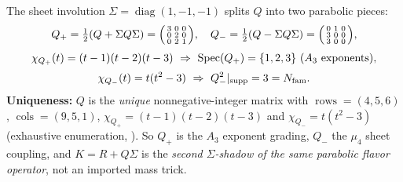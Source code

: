 \begin{keybox}
The sheet involution $\Sigma=\operatorname{diag}(1,-1,-1)$ splits $Q$ into two parabolic pieces:
\[
  Q_+=\tfrac12(Q+\Sigma Q\Sigma)=\begin{psmallmatrix}3&0&0\\0&2&0\\0&2&1\end{psmallmatrix},\quad
  Q_-=\tfrac12(Q-\Sigma Q\Sigma)=\begin{psmallmatrix}0&1&0\\3&0&0\\3&0&0\end{psmallmatrix},
\]
\[
  \begin{gathered}
  \chi_{Q_+}(t)=(t-1)(t-2)(t-3)\ \Rightarrow\ \operatorname{Spec}(Q_+)=\{1,2,3\}\ (A_3\text{ exponents}),\\[2pt]
  \chi_{Q_-}(t)=t(t^2-3)\ \Rightarrow\ Q_-^2|_{\mathrm{supp}}=3=\Nfam .
  \end{gathered}
\]
\textbf{Uniqueness:} $Q$ is the \emph{unique} nonnegative-integer matrix with $\operatorname{rows}=(4,5,6)$,
$\operatorname{cols}=(9,5,1)$, $\chi_{Q_+}=(t-1)(t-2)(t-3)$ and $\chi_{Q_-}=t(t^2-3)$ (exhaustive
enumeration, ). So $Q_+$ is the $A_3$ exponent grading, $Q_-$ the $\mu_4$ sheet
coupling, and $K=R+Q\Sigma$ is the \emph{second $\Sigma$-shadow of the same parabolic flavor operator}, not
an imported mass trick.


\end{keybox}

